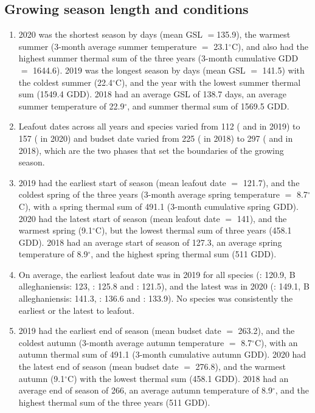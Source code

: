 \documentclass{article}\usepackage[]{graphicx}\usepackage[]{xcolor}
\begin{document}
\subsection{Growing season length and conditions}
\begin{enumerate}

\item 2020 was the shortest season by days (mean GSL $=$135.9), the warmest summer
(3-month average summer temperature $=$ 23.1$^\circ$C), and also had the highest summer thermal sum of the three years
(3-month cumulative GDD $=$ 1644.6). 
2019 was the longest season by days (mean GSL $=$
141.5)
with the coldest summer 
(22.4$^\circ$C), and the year with the lowest summer thermal sum
(1549.4 GDD). 
2018 had an average GSL of 138.7 days, 
an average summer temperature of 
22.9$^\circ$, and summer thermal sum of 
1569.5 GDD.

\item Leafout dates across all years and species varied from 
112 ({\Ainc} and {\Bpop} in 
2019) to 
157 ({\Ainc} in 
2020) and budset date varied from 
225 ({\Ball} in 2018) to 
297 ({\Ainc} and {\Bpop} in 2018), which are the two phases that set the boundaries of the growing season.

\item 2019 had the earliest start of season (mean leafout date $=$
121.7), and the coldest spring of the three years
(3-month average spring temperature $=$ 8.7$^\circ$C), with a spring thermal sum of 
491.1 (3-month cumulative spring GDD). 
2020 had the latest start of season (mean leafout date $=$
141), 
and the warmest spring
(9.1$^\circ$C), but the lowest thermal sum of three years
(458.1 GDD). 
2018 had an average start of season of 127.3, an average spring temperature of
8.9$^\circ$, and the highest spring thermal sum
(511 GDD).

\item On average, the earliest leafout date was in 2019 for all species (\Ainc: 120.9, 
B alleghaniensis: 123, 
\Bpap: 125.8 and 
\Bpop: 121.5), and the latest was in 2020
(\Ainc: 149.1, 
B alleghaniensis: 141.3, 
\Bpap: 136.6 and 
\Bpop: 133.9).
No species was consistently the earliest or the latest to leafout.

\item 2019 had the earliest end of season (mean budset date $=$ 263.2), and the coldest autumn (3-month average autumn temperature $=$
8.7$^\circ$C), with an autumn thermal sum of
491.1 (3-month cumulative autumn GDD).
2020 had the latest end of season (mean budset date $=$ 276.8), and the warmest autumn 
(9.1$^\circ$C) with the lowest thermal sum
(458.1 GDD). 
2018 had an average end of season of 266, an average autumn temperature of 
8.9$^\circ$, 
and the highest thermal sum of the three years (511 GDD).


\end{enumerate}
\end{document}
